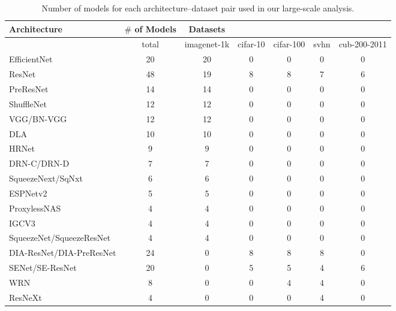 
\begin{table}[t]
\small
\begin{center}
\begin{tabular}{|l|c|c|c|c|c|c|}
\hline
Architecture & $\#$ of Models & Datasets & & & & \\
\hline

  & total &imagenet-1k & cifar-10 & cifar-100 & svhn & cub-200-2011 \\
\hline
EfficientNet & 20 &20 & 0 & 0 & 0 & 0 \\
ResNet & 48 &19 & 8 & 8 & 7 & 6 \\
PreResNet & 14 &14 & 0 & 0 & 0 & 0 \\
ShuffleNet & 12 &12 & 0 & 0 & 0 & 0 \\
VGG/BN-VGG & 12 &12 & 0 & 0 & 0 & 0 \\
DLA & 10 &10 & 0 & 0 & 0 & 0 \\
HRNet & 9 &9 & 0 & 0 & 0 & 0 \\
DRN-C/DRN-D & 7 &7 & 0 & 0 & 0 & 0 \\
SqueezeNext/SqNxt & 6 &6 & 0 & 0 & 0 & 0 \\
ESPNetv2 & 5 &5 & 0 & 0 & 0 & 0 \\
ProxylessNAS & 4 &4 & 0 & 0 & 0 & 0 \\
IGCV3 & 4 &4 & 0 & 0 & 0 & 0 \\
SqueezeNet/SqueezeResNet & 4 &4 & 0 & 0 & 0 & 0 \\
DIA-ResNet/DIA-PreResNet & 24 &0 & 8 & 8 & 8 & 0 \\
SENet/SE-ResNet & 20 &0 & 5 & 5 & 4 & 6 \\
WRN & 8 &0 & 0 & 4 & 4 & 0 \\
ResNeXt & 4 &0 & 0 & 0 & 4 & 0 \\

\hline
\end{tabular}
\end{center}
\caption{Number of models for each architecture--dataset pair used in our large-scale analysis.}
\label{table:architectures}
\end{table}

